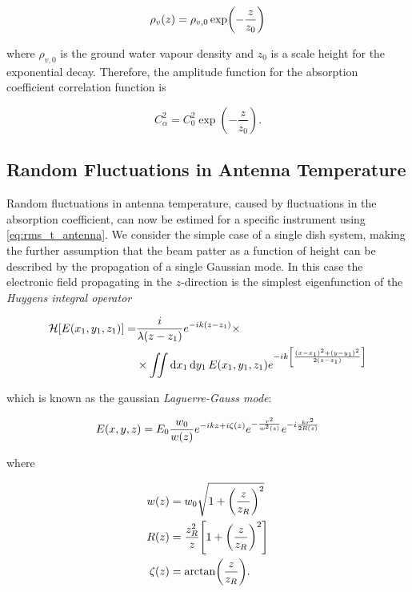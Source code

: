 \begin{equation}
        \rho_v\qty(z) = \rho_{v,0} \exp(-\frac{z}{z_0})
\end{equation}

where $\rho_{v,0}$ is the ground water vapour density and $z_0$ is a scale
height for the exponential decay. Therefore, the amplitude function for the
absorption coefficient correlation function is

\begin{equation}
        C^2_\alpha = C^2_0\exp(-\frac{z}{z_0}).
\end{equation}

\subsection{Random Fluctuations in Antenna Temperature}

Random fluctuations in antenna temperature, caused by fluctuations in the
absorption coefficient, can now be estimed for a specific instrument using
\autoref{eq:rms_t_antenna}. We consider the simple case of a single dish
system, making the further assumption that the beam patter as a function of
height can be described by the propagation of a single Gaussian mode.
In this case the electronic field propagating in the $z$-direction is the
simplest eigenfunction of the \emph{Huygens integral operator}

\begin{equation}
        \begin{split}
                \mathcal{H}\qty[E\qty(x_1,y_1,z_1)] = &
                \frac{i}{\lambda \qty(z - z_1)} e^{-ik\qty(z - z_1)} \times \\
                & \times \iint \dd{x_1}\dd{y_1} E\qty(x_1,y_1,z_1)
                e^{-ik\qty[\frac{\qty(x - x_1)^2 +
                \qty(y - y_1) ^2}{2\qty(z - z_1)}]}
        \end{split}
\end{equation}

which is known as the gaussian \emph{Laguerre-Gauss mode}:

\begin{equation}
        E\qty(x,y,z) = E_0 \frac{w_0}{w\qty(z)} e^{-ikz + i\zeta\qty(z)}
        e^{-\frac{r^2}{w^2\qty(z)}} e^{-i\frac{kr^2}{2R\qty(z)}}
\end{equation}

where

\begin{align}
        w\qty(z) & = w_0 \sqrt{1 + \qty(\frac{z}{z_R})^2} \\
        R\qty(z) & = \frac{z^2_R}{z}\qty[1 + \qty(\frac{z}{z_R})^2] \\
        \zeta\qty(z) & = \arctan(\frac{z}{z_R}).
\end{align}

